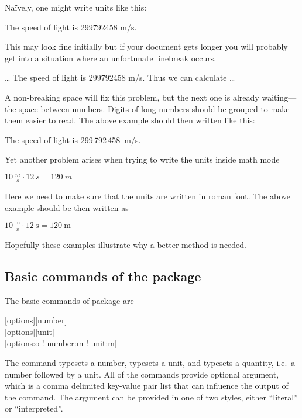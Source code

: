 Naïvely, one might write units like this:
\begin{example}[examplewidth=6cm]
The speed of light
is 299792458 m/s.
\end{example}
\noindent This may look fine initially but if your document gets longer you will probably
get into a situation where an unfortunate linebreak occurs.
\begin{example}[examplewidth=6cm]
\ldots{} The speed of light
is 299792458 m/s. Thus we
can calculate \ldots
\end{example}
\noindent A non-breaking space will fix this problem, but the next one is already waiting---the space between numbers. Digits of
long numbers should be grouped to make them easier to read. The above example
should then written like this:
\begin{example}[examplewidth=6cm]
The speed of light is
299\,792\,458~m/s.
\end{example}
\noindent Yet another problem arises when trying to write the units inside math
mode
\begin{example}[examplewidth=6cm]
$10~\frac{m}{s} \cdot 12~s = 120~m$
\end{example}
\noindent Here we need to make sure that the units are written in roman font.
The above example should be then written as
\begin{example}[examplewidth=6cm]
$10~\frac{\mathrm{m}}{\mathrm{s}} 
  \cdot 12~\mathrm{s} 
  = 120~\mathrm{m}$
\end{example}
\noindent Hopefully these examples illustrate why a better method is needed.

\subsection{Basic commands of the  package}

The basic commands of  package are
\begin{lscommand}
  [options][number]\\
  [options][unit]\\
  [options:o ! number:m ! unit:m] 
\end{lscommand}
The  command typesets a number,  typesets a unit, and 
typesets a quantity, i.e.\ a number followed by a unit. All of the commands
provide optional  argument, which is a comma delimited key-value pair
list that can influence the output of the command. The  argument can
be provided in one of two styles, either \enquote{literal} or
\enquote{interpreted}.

